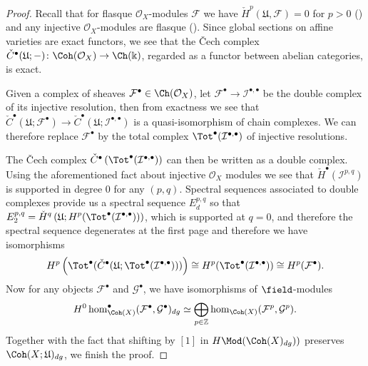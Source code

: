 \begin{proof}
    Recall that for flasque $\mathcal{O}_X$-modules $\mathcal{F}$ we have $\check{H}^p (\mathfrak{U},\mathcal{F})=0$ for $p>0$ (\cite[Chapter 3, Proposition 4.3]{Hartshorne77}) and any injective $\mathcal{O}_X$-modules are flasque (\cite[Chapter 3, Lemma 2.4]{Hartshorne77}). Since global sections on affine varieties are exact functors, we see that the \v{C}ech complex $\check{C}^{\bullet} (\mathfrak{U};-)\colon\Coh (\mathcal{O}_X)\to\Ch (\Bbbk)$, regarded as a functor between abelian categories, is exact.\par
    Given a complex of sheaves $\mathcal{F}^{\bullet}\in\Ch (\mathcal{O}_X)$, let $\mathcal{F}^{\bullet}\to\mathcal{I}^{\bullet,\bullet}$ be the double complex of its injective resolution, then from exactness we see that $\check{C}^{\bullet} (\mathfrak{U};\mathcal{F}^{\bullet})\to\check{C}^{\bullet} (\mathfrak{U};\mathcal{I}^{\bullet,\bullet})$ is a quasi-isomorphism of chain complexes. We can therefore replace $\mathcal{F}^{\bullet}$ by the total complex $\Tot^{\bullet} (\mathcal{I}^{\bullet,\bullet})$ of injective resolutions.\par
    The \v{C}ech complex $\check{C}^{\bullet}\left(\Tot^{\bullet} (\mathcal{I}^{\bullet,\bullet})\right)$ can then be written as a double complex. Using the aforementioned fact about injective $\mathcal{O}_X$ modules we see that $\displaystyle\check{H}^{\bullet} (\mathcal{I}^{p,q})$ is supported in degree $0$ for any $(p,q)$. Spectral sequences associated to double complexes \cite[\href{https://stacks.math.columbia.edu/tag/012X}{Section 012X}]{stacks-project} provide us a spectral sequence $E^{p,q}_d$ so that $E_2^{p,q}=\displaystyle\check{H}^q\left(\mathfrak{U};H^p(\Tot^{\bullet}(\mathcal{I}^{\bullet,\bullet}))\right)$, which is supported at $q=0$, and therefore the spectral sequence degenerates at the first page and therefore we have isomorphisms\[
    H^p\left(\Tot^{\bullet}(\check{C}^{\bullet} (\mathfrak{U};\Tot^{\bullet} (\mathcal{I}^{\bullet,\bullet})))\right)\cong H^p (\Tot^{\bullet} (\mathcal{I}^{\bullet,\bullet}))\cong H^p (\mathcal{F}^{\bullet}).
    \]
    Now for any objects $\mathcal{F}^{\bullet}$ and $\mathcal{G}^{\bullet}$, we have isomorphisms of $\field$-modules\[
    H^0\hom^{\bullet}_{\Coh (X)} (\mathcal{F}^{\bullet},\mathcal{G}^{\bullet})_{dg}\simeq\bigoplus_{p\in\mathbb{Z}}\hom_{\Coh (X)} (\mathcal{F}^p,\mathcal{G}^p).
    \]Together with the fact that shifting by $[1]$ in $H\Mod (\Coh(X)_{dg}))$ preserves $\Coh (X;\mathfrak{U})_{dg}$, we finish the proof.
\end{proof}
